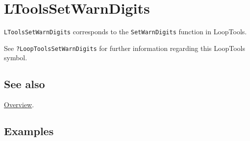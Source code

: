 \documentclass[../FeynHelpersManual.tex]{subfiles}
\begin{document}
\hypertarget{ltoolssetwarndigits}{
\section{LToolsSetWarnDigits}\label{ltoolssetwarndigits}}

\texttt{LToolsSetWarnDigits} corresponds to the \texttt{SetWarnDigits}
function in LoopTools.

See \texttt{?LoopTools\textasciigrave SetWarnDigits} for further
information regarding this LoopTools symbol.

\subsection{See also}

\hyperlink{toc}{Overview}.

\subsection{Examples}
\end{document}
